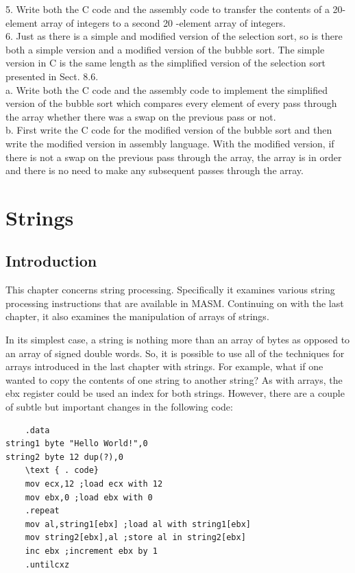 \documentclass[10pt]{article}
\begin{document}
5. Write both the C code and the assembly code to transfer the contents of a 20-element array of integers to a second 20 -element array of integers.\\
6. Just as there is a simple and modified version of the selection sort, so is there both a simple version and a modified version of the bubble sort. The simple version in C is the same length as the simplified version of the selection sort presented in Sect. 8.6.\\
a. Write both the C code and the assembly code to implement the simplified version of the bubble sort which compares every element of every pass through the array whether there was a swap on the previous pass or not.\\
b. First write the C code for the modified version of the bubble sort and then write the modified version in assembly language. With the modified version, if there is not a swap on the previous pass through the array, the array is in order and there is no need to make any subsequent passes through the array.

\section*{Strings}
\subsection*{Introduction}
This chapter concerns string processing. Specifically it examines various string processing instructions that are available in MASM. Continuing on with the last chapter, it also examines the manipulation of arrays of strings.

In its simplest case, a string is nothing more than an array of bytes as opposed to an array of signed double words. So, it is possible to use all of the techniques for arrays introduced in the last chapter with strings. For example, what if one wanted to copy the contents of one string to another string? As with arrays, the ebx register could be used an index for both strings. However, there are a couple of subtle but important changes in the following code:

\begin{verbatim}
    .data
string1 byte "Hello World!",0
string2 byte 12 dup(?),0
    \text { . code}
    mov ecx,12 ;load ecx with 12
    mov ebx,0 ;load ebx with 0
    .repeat
    mov al,string1[ebx] ;load al with string1[ebx]
    mov string2[ebx],al ;store al in string2[ebx]
    inc ebx ;increment ebx by 1
    .untilcxz
\end{verbatim}
\end{document}

